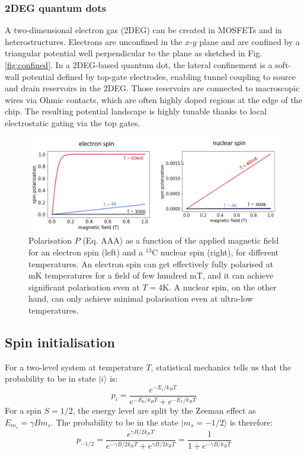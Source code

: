 \documentclass[a4paper,11pt]{article}
\newcommand{\ket}[1]{| #1 \rangle}
\begin{document}
\subsubsection {2DEG quantum dots}
A two-dimensional electron gas (2DEG) can be created in MOSFETs and in heterostructures. Electrons are unconfined in the $x$-$y$ plane and are confined by a triangular potential well perpendicular to the plane as sketched in Fig. \ref{fig:confined}.  In a 2DEG-based quantum dot, the lateral confinement is a soft-wall potential defined by top-gate electrodes, enabling tunnel coupling to
source and drain reservoirs in the 2DEG. Those reservoirs are connected to macroscopic wires via Ohmic contacts, which are often highly doped regions at the edge of the chip. The resulting potential landscape is highly tunable thanks to local electrostatic gating via the top gates.

\begin{figure}[h]
\centering
\includegraphics[width = 1\textwidth]{figures/spin_polarisation.png}
\caption{Polarisation $P$ (Eq. AAA) as a function of the applied magnetic field for an electron spin (left) and a $^{13}$C nuclear spin (right), for different temperatures. An electron spin can get effectively fully polarised at mK temperatures for a field of few hundred mT, and it can achieve significant polarisation even at $T=4$K. A nuclear spin, on the other hand, can only achieve minimal polarisation even at ultra-low temperatures.}
\label{fig:spin_polar}
\end{figure}

\subsection {Spin initialisation}
For a two-level system at temperature $T$, statistical mechanics tells us that the probability to be in state $\ket{i}$ is:
\begin{equation}
    p_i = \frac{e^{-E_i/k_BT}}{e^{-E_0/k_BT} + e^{-E_1/k_BT}}
\end{equation}
For a spin $S=1/2$, the energy level are split by the Zeeman effect as $E_{m_s} = \gamma B m_s$. The probability to be in the state $\ket{m_s=-1/2}$ is therefore:
\begin{equation}
    p_{-1/2} = \frac{e^{\gamma B/2 k_BT}}{e^{-\gamma B/2k_BT} + e^{\gamma B/2 k_B T}} = \frac{1}{1 + e^{-\gamma B/k_B T}}
\end{equation}
\end{document}
